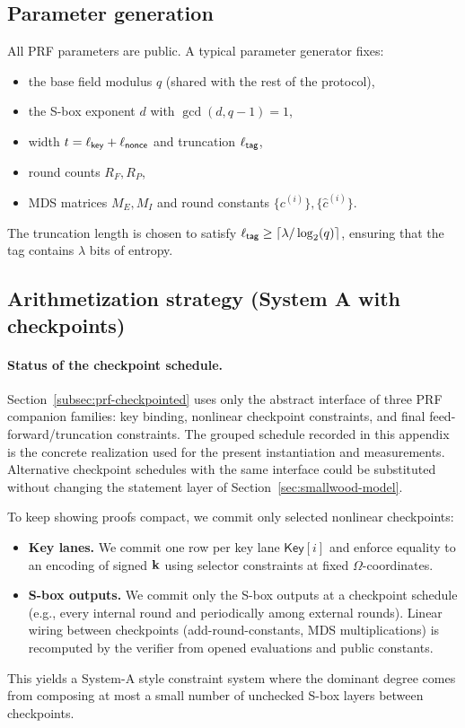 \subsection{Parameter generation}
All PRF parameters are public. A typical parameter generator fixes:
\begin{itemize}[leftmargin=1.25em]
  \item the base field modulus \(q\) (shared with the rest of the protocol),
  \item the S-box exponent \(d\) with \(\gcd(d,q-1)=1\),
  \item width \(t=\ell_{\mathsf{key}}+\ell_{\mathsf{nonce}}\) and truncation \(\ell_{\mathsf{tag}}\),
  \item round counts \(R_F,R_P\),
  \item MDS matrices \(M_E,M_I\) and round constants \(\{c^{(i)}\},\{\hat c^{(i)}\}\).
\end{itemize}
The truncation length is chosen to satisfy \(\ell_{\mathsf{tag}}\ge \lceil \lambda/\log_2(q)\rceil\), ensuring that the
tag contains \(\lambda\) bits of entropy.

\subsection{Arithmetization strategy (System A with checkpoints)}
\paragraph{Status of the checkpoint schedule.}
Section~\ref{subsec:prf-checkpointed} uses only the abstract interface of three PRF companion families: key binding,
nonlinear checkpoint constraints, and final feed-forward/truncation constraints. The grouped schedule recorded in this
appendix is the concrete realization used for the present instantiation and measurements. Alternative checkpoint schedules
with the same interface could be substituted without changing the statement layer of
Section~\ref{sec:smallwood-model}.

To keep showing proofs compact, we commit only selected nonlinear checkpoints:
\begin{itemize}[leftmargin=1.25em]
  \item \textbf{Key lanes.} We commit one row per key lane \(\mathsf{Key}[i]\) and enforce equality to an encoding of
  signed \(\mathbf{k}\) using selector constraints at fixed \(\Omega\)-coordinates.
  \item \textbf{S-box outputs.} We commit only the S-box outputs at a checkpoint schedule (e.g., every internal round and
  periodically among external rounds). Linear wiring between checkpoints (add-round-constants, MDS multiplications) is
  recomputed by the verifier from opened evaluations and public constants.
\end{itemize}
This yields a System-A style constraint system where the dominant degree comes from composing at most a small number of
unchecked S-box layers between checkpoints.
